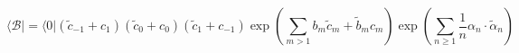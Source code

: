 \begin{equation}
\langle \mathcal{B} |  = 
\langle 0| (\tilde{c}_{-1}+c_{1})(\tilde{c}_{0}+c_{0})(\tilde{c}_{1}+c_{-1})
  \exp\left( \sum_{m > 1} b_m \tilde{c}_m +\tilde{b}_m c_m \right)
  \exp\left( \sum_{n\geq 1} \frac{1}{n} \alpha_n \cdot \tilde{\alpha}_n \right)
\end{equation}

